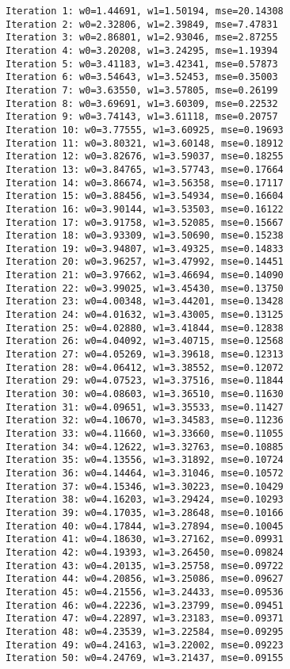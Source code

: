 \documentclass[11pt]{article}
\begin{document}
    \begin{Verbatim}[commandchars=\\\{\}]
Iteration 1: w0=1.44691, w1=1.50194, mse=20.14308
Iteration 2: w0=2.32806, w1=2.39849, mse=7.47831
Iteration 3: w0=2.86801, w1=2.93046, mse=2.87255
Iteration 4: w0=3.20208, w1=3.24295, mse=1.19394
Iteration 5: w0=3.41183, w1=3.42341, mse=0.57873
Iteration 6: w0=3.54643, w1=3.52453, mse=0.35003
Iteration 7: w0=3.63550, w1=3.57805, mse=0.26199
Iteration 8: w0=3.69691, w1=3.60309, mse=0.22532
Iteration 9: w0=3.74143, w1=3.61118, mse=0.20757
Iteration 10: w0=3.77555, w1=3.60925, mse=0.19693
Iteration 11: w0=3.80321, w1=3.60148, mse=0.18912
Iteration 12: w0=3.82676, w1=3.59037, mse=0.18255
Iteration 13: w0=3.84765, w1=3.57743, mse=0.17664
Iteration 14: w0=3.86674, w1=3.56358, mse=0.17117
Iteration 15: w0=3.88456, w1=3.54934, mse=0.16604
Iteration 16: w0=3.90144, w1=3.53503, mse=0.16122
Iteration 17: w0=3.91758, w1=3.52085, mse=0.15667
Iteration 18: w0=3.93309, w1=3.50690, mse=0.15238
Iteration 19: w0=3.94807, w1=3.49325, mse=0.14833
Iteration 20: w0=3.96257, w1=3.47992, mse=0.14451
Iteration 21: w0=3.97662, w1=3.46694, mse=0.14090
Iteration 22: w0=3.99025, w1=3.45430, mse=0.13750
Iteration 23: w0=4.00348, w1=3.44201, mse=0.13428
Iteration 24: w0=4.01632, w1=3.43005, mse=0.13125
Iteration 25: w0=4.02880, w1=3.41844, mse=0.12838
Iteration 26: w0=4.04092, w1=3.40715, mse=0.12568
Iteration 27: w0=4.05269, w1=3.39618, mse=0.12313
Iteration 28: w0=4.06412, w1=3.38552, mse=0.12072
Iteration 29: w0=4.07523, w1=3.37516, mse=0.11844
Iteration 30: w0=4.08603, w1=3.36510, mse=0.11630
Iteration 31: w0=4.09651, w1=3.35533, mse=0.11427
Iteration 32: w0=4.10670, w1=3.34583, mse=0.11236
Iteration 33: w0=4.11660, w1=3.33660, mse=0.11055
Iteration 34: w0=4.12622, w1=3.32763, mse=0.10885
Iteration 35: w0=4.13556, w1=3.31892, mse=0.10724
Iteration 36: w0=4.14464, w1=3.31046, mse=0.10572
Iteration 37: w0=4.15346, w1=3.30223, mse=0.10429
Iteration 38: w0=4.16203, w1=3.29424, mse=0.10293
Iteration 39: w0=4.17035, w1=3.28648, mse=0.10166
Iteration 40: w0=4.17844, w1=3.27894, mse=0.10045
Iteration 41: w0=4.18630, w1=3.27162, mse=0.09931
Iteration 42: w0=4.19393, w1=3.26450, mse=0.09824
Iteration 43: w0=4.20135, w1=3.25758, mse=0.09722
Iteration 44: w0=4.20856, w1=3.25086, mse=0.09627
Iteration 45: w0=4.21556, w1=3.24433, mse=0.09536
Iteration 46: w0=4.22236, w1=3.23799, mse=0.09451
Iteration 47: w0=4.22897, w1=3.23183, mse=0.09371
Iteration 48: w0=4.23539, w1=3.22584, mse=0.09295
Iteration 49: w0=4.24163, w1=3.22002, mse=0.09223
Iteration 50: w0=4.24769, w1=3.21437, mse=0.09155

    \end{Verbatim}
\end{document}
